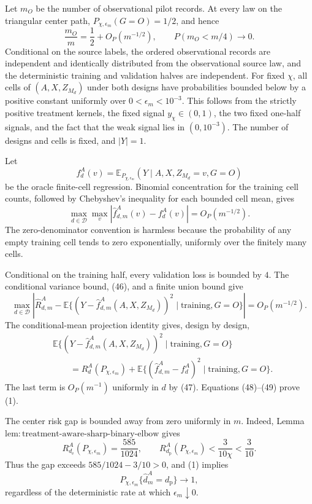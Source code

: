Let \(m_O\) be the number of observational pilot records.  At every law on the triangular center path, \(P_{\chi,\epsilon_m}(G=O)=1/2\), and hence
\[
 \frac{m_O}{m}=\frac12+O_P(m^{-1/2}),
 \qquad P(m_O<m/4)\longrightarrow0.                       \tag{46}
\]
Conditional on the source labels, the ordered observational records are independent and identically distributed from the observational source law, and the deterministic training and validation halves are independent.  For fixed \(\chi\), all cells of \((A,X,Z_{M_d})\) under both designs have probabilities bounded below by a positive constant uniformly over \(0<\epsilon_m<10^{-3}\).  This follows from the strictly positive treatment kernels, the fixed signal \(y_\chi\in(0,1)\), the two fixed one-half signals, and the fact that the weak signal lies in \((0,10^{-3})\).  The number of designs and cells is fixed, and \(|Y|=1\).

Let
\[
 f_d^A(v)=\mathbb E_{P_{\chi,\epsilon_m}}(Y\mid A,X,Z_{M_d}=v,G=O)
\]
be the oracle finite-cell regression.  Binomial concentration for the training cell counts, followed by Chebyshev's inequality for each bounded cell mean, gives
\[
 \max_{d\in\mathcal D}\max_v
 |\widehat f_{d,m}^A(v)-f_d^A(v)|=O_P(m^{-1/2}).            \tag{47}
\]
The zero-denominator convention is harmless because the probability of any empty training cell tends to zero exponentially, uniformly over the finitely many cells.

Conditional on the training half, every validation loss is bounded by \(4\).  The conditional variance bound, (46), and a finite union bound give
\[
 \max_{d\in\mathcal D}\left|
 \widehat R_{d,m}^A-
 \mathbb E\{(Y-\widehat f_{d,m}^A(A,X,Z_{M_d}))^2
 \mid\text{training},G=O\}
 \right|=O_P(m^{-1/2}).                                   \tag{48}
\]
The conditional-mean projection identity gives, design by design,
\[
\begin{aligned}
 &\mathbb E\{(Y-\widehat f_{d,m}^A(A,X,Z_{M_d}))^2
 \mid\text{training},G=O\}\\
 &\qquad=R_d^A(P_{\chi,\epsilon_m})
 +\mathbb E\{(\widehat f_{d,m}^A-f_d^A)^2
 \mid\text{training},G=O\}.
\end{aligned}                                               \tag{49}
\]
The last term is \(O_P(m^{-1})\) uniformly in \(d\) by (47).  Equations (48)--(49) prove (1).

The center risk gap is bounded away from zero uniformly in \(m\).  Indeed, Lemma~\(\mathrm{lem{:}treatment\text{-}aware\text{-}sharp\text{-}binary\text{-}elbow}\) gives
\[
 R_{d_{\mathrm e}}^A(P_{\chi,\epsilon_m})
 =\frac{585}{1024},
 \qquad
 R_{d_{\mathrm p}}^A(P_{\chi,\epsilon_m})
 <\frac3{10\chi}<\frac3{10}.
\]
Thus the gap exceeds \(585/1024-3/10>0\), and (1) implies
\[
 P_{\chi,\epsilon_m}\{\widehat d_m^A=d_{\mathrm p}\}\longrightarrow1,
\]
regardless of the deterministic rate at which \(\epsilon_m\downarrow0\).

